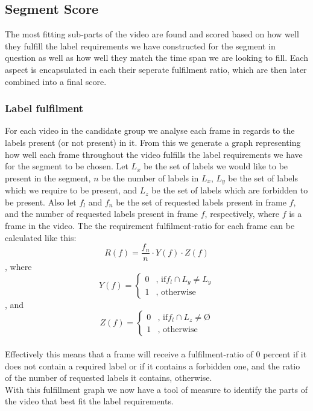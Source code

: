 \subsection{Segment Score}\label{sec:segment_score}
%
%
The most fitting sub-parts of the video are found and scored based on how well they fulfill the label requirements we have constructed for the segment in question as well as how well they match the time span we are looking to fill. Each aspect is encapsulated in each their seperate fulfilment ratio, which are then later combined into a final score.
%
\subsubsection{Label fulfilment}
%
For each video in the candidate group we analyse each frame in regards to the labels present (or not present) in it. From this we generate a graph representing how well each frame throughout the video fulfills the label requirements we have for the segment to be chosen. Let $L_{x}$ be the set of labels we would like to be present in the segment, $n$ be the number of labels in $L_{x}$, $L_{y}$ be the set of labels which we require to be present, and $L_{z}$ be the set of labels which are forbidden to be present. Also let $f_{l}$ and $f_{n}$ be the set of requested labels present in frame $f$, and the number of requested labels present in frame $f$, respectively, where $f$ is a frame in the video. The the requirement fulfilment-ratio for each frame can be calculated like this:\\
%
\begin{equation}
R(f) = \frac{f_{n}}{n} \cdot Y(f) \cdot Z(f)
\end{equation} 
%
, where\\
%
\begin{equation}
Y(f) =
\begin{cases}
0 & \text{, if} f_{l} \cap L_{y} \neq L_{y}\\
1 &  \text{, otherwise}
\end{cases}
\end{equation} 
%
, and\\
%
\begin{equation}
Z(f) =
\begin{cases}
0 & \text{, if} f_{l} \cap L_{z} \neq Ø\\
1 &  \text{, otherwise}
\end{cases}
\end{equation} 
%
\\
%
Effectively this means that a frame will receive a fulfilment-ratio of 0 percent if it does not contain a required label or if it contains a forbidden one, and the ratio of the number of requested labels it contains, otherwise.\\
%
With this fulfillment graph we now have a tool of measure to identify the parts of the video that best fit the label requirements.
%
